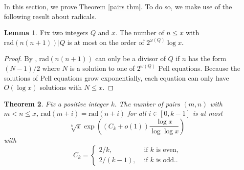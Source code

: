 \documentclass{article}
\theoremstyle{plain}
\newtheorem{thm}{Theorem}
\theoremstyle{definition}
\newtheorem{lemma}[thm]{Lemma}
\begin{document}
In this section, we prove Theorem \ref{pairs thm}. To do so, we make use of the following result about radicals.

\begin{lemma} \label{lehmer lemma} Fix two integers $Q$ and $x$. The number of $n \leq x$ with $\textrm{rad} (n(n + 1)) | Q$ is at most on the order of $2^{\omega(Q)} \log x$.
\end{lemma}

\begin{proof} By \cite[Thm. 1]{Le}, $\textrm{rad} (n(n + 1))$ can only be a divisor of $Q$ if $n$ has the form $(N - 1)/2$ where $N$ is a solution to one of $2^{\omega(Q)}$ Pell equations. Because the solutions of Pell equations grow exponentially, each equation can only have $O(\log x)$ solutions with $N \leq x$.
\end{proof}

\begin{thm} Fix a positive integer $k$. The number of pairs $(m, n)$ with $m < n \leq x$, $\textrm{rad} (m + i) = \textrm{rad} (n + i)$ for all $i \in [0, k - 1]$ is at most
\[\sqrt[k]{x} \exp\left((C_k + o(1)) \frac{\log x}{\log \log x}\right)\]
with
\[C_k = \left\{\begin{array}{ll}
2/k, & \textrm{ if } k \textrm{ is even,} \\
2/(k - 1), & \textrm{ if } k \textrm{ is odd.}.
\end{array}\right.\]
\end{thm}
\end{document}
